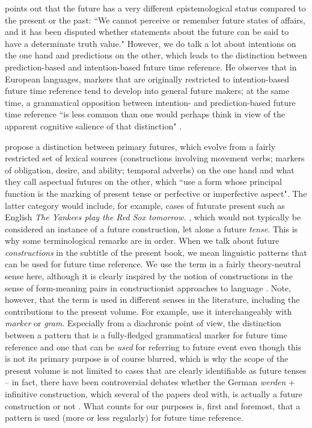 \documentclass[output=paper,colorlinks,citecolor=brown]{langscibook}
\begin{document}
\citet[309--310]{Dahl2000} points out that the future has a very different epistemological status compared to the present or the past: ``We cannot perceive or remember future states of affairs, and it has been disputed whether statements about the future can be said to have a determinate truth value." However, we do talk a lot about intentions on the one hand and predictions on the other, which leads \citet[310]{Dahl2000} to the distinction between prediction-based and intention-based future time reference. He observes that in European languages, markers that are originally restricted to intention-based future time reference tend to develop into general future makers; at the same time, a grammatical opposition between intention- and prediction-based future time reference ``is less common than one would perhaps
think in view of the apparent cognitive salience of that distinction" \citep[][310]{Dahl2000}.

\citet[244]{BybeePerkinsPagliuca1994} propose a distinction between primary futures, which evolve from a fairly restricted set of lexical sources (constructions involving movement verbs; markers of obligation, desire, and ability; temporal adverbs) on the one hand and what they call aspectual futures on the other, which ``use a form whose principal function is the marking of present tense or perfective or imperfective aspect". The latter category would include, for example, cases of futurate present such as English \textit{The Yankees play the Red Sox tomorrow.} \citep[][158]{Hilpert2008}, which would not typically be considered an instance of a future construction, let alone a future \textit{tense}. This is why some terminological remarks are in order. When we talk about future \textit{constructions} in the subtitle of the present book, we mean linguistic patterns that can be used for future time reference. We use the term in a fairly theory-neutral sense here, although it is clearly inspired by the notion of constructions in the sense of form-meaning pairs in constructionist approaches to language \citep[][]{ungerer_constructionist_2023}. Note, however, that the term is used in different senses in the literature, including the contributions to the present volume. For example, \citet[1]{wiemer_between_2024} use it interchangeably with \textit{marker} or \textit{gram}. Especially from a diachronic point of view, the distinction between a pattern that is a fully-fledged grammatical marker for future time reference and one that can be \textit{used} for referring to future event even though this is not its primary purpose is of course blurred, which is why the scope of the present volume is not limited to cases that are clearly identifiable as future tenses -- in fact, there have been controversial debates whether the German \textit{werden} + infinitive construction, which several of the papers deal with, is actually a future construction or not \citep[e.g.][]{Saltveit1962, vater1975}. What counts for our purposes is, first and foremost, that a pattern is used (more or less regularly) for future time reference. 
\end{document}

